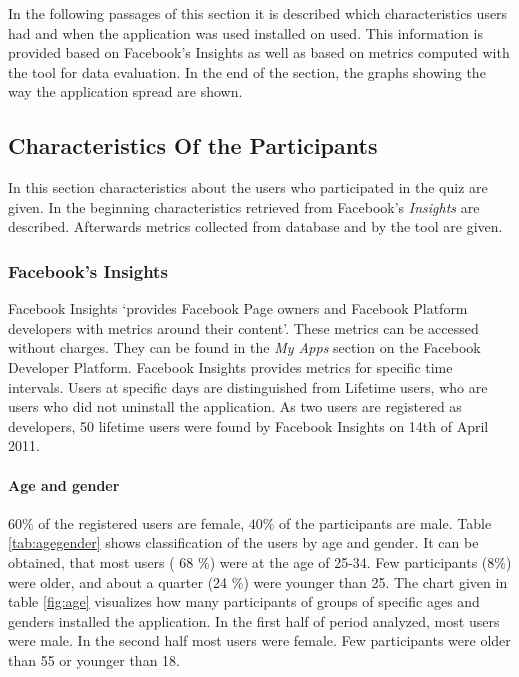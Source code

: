 \documentclass[preprint,12pt]{elsarticle}
\begin{document}
In the following passages of this section it is described which
characteristics users had and when the application was used installed
on used. This information is provided based on Facebook's Insights as well as
based on metrics computed with the tool for data
evaluation. In the end of the section,
the graphs showing the way the application spread are shown.

\subsection{Characteristics Of the Participants}
\label{sec:characteristics}
In this section characteristics about the users who participated in
the quiz are given. In the beginning characteristics retrieved from
Facebook's
\textit{Insights} are described.\cite{facebookInsights} Afterwards
metrics collected from database and by the tool are given. 

\subsubsection{Facebook's Insights}
Facebook Insights `provides Facebook Page owners and Facebook Platform
developers with metrics around their content'.\cite{facebookInsights}
These metrics can be accessed without charges. They can be found in the \textit{My Apps}
section on the Facebook Developer Platform.
Facebook Insights provides metrics for specific time intervals. Users
at specific days are distinguished from Lifetime users, who are users
who did not uninstall the application. As two users are registered as
developers, 50 lifetime users were found by Facebook Insights on 14th of April 2011.

\paragraph{Age and gender}
\label{sec:age-gender}
$60 \%$ of the registered users are female, $40 \%$ of the participants
are male. Table \ref{tab:agegender} shows classification of the users
by age and gender. It can be obtained, that most users ( 68 \%) were at
the age of 25-34. Few participants ($8 \%$) were older, and about a
quarter (24 \%) were younger than 25. The chart given in table \ref{fig:age}
visualizes how many participants of groups of specific ages and
genders installed the application. In the first half of period
analyzed, most users were male. In the second half most users were 
female. Few participants were older than 55 or younger than 18.
\end{document}
